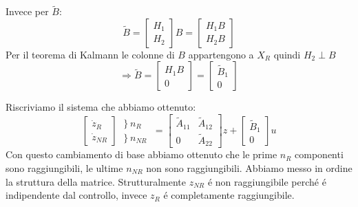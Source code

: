 \documentclass[../main.tex]{subfiles}
\begin{document}
		Invece per $ \tilde B $:
		\[
			\tilde B=
			\begin{bmatrix}
				H_1\\
				H_2
			\end{bmatrix} B =
			\begin{bmatrix}
				H_1 B\\
				H_2 B
			\end{bmatrix}
		\]
		Per il teorema di Kalmann le colonne di $ B $ appartengono a $ X_R $ quindi $ H_2 \perp B $
		\[
			\Rightarrow \tilde B =
			\begin{bmatrix}
				H_1 B\\
				0
			\end{bmatrix} =
			\begin{bmatrix}
					\tilde B_1\\
					0
			\end{bmatrix}
		\]
		
		Riscriviamo il sistema che abbiamo ottenuto:
		\[
			\begin{bmatrix}
				\dot z_R\\
				\dot z_{NR}
			\end{bmatrix}
			\begin{matrix}
				\left. \right\rbrace n_R \phantom{R}\\
				\left. \right\rbrace n_{NR}
			\end{matrix} =
			\begin{bmatrix}
				\tilde A_{11} & \tilde A_{12}\\
				0 & \tilde A_{22}
			\end{bmatrix} z +
			\begin{bmatrix}
				\tilde B_1\\
				0
			\end{bmatrix} u
		\]
		Con questo cambiamento di base abbiamo ottenuto che le prime $ n_R $ componenti sono raggiungibili, le ultime $ n_{NR} $ non sono raggiungibili. Abbiamo messo in ordine la struttura della matrice. Strutturalmente $ z_{NR} $ \'e non raggiungibile perch\'e \'e indipendente dal controllo, invece $ z_R $ \'e completamente raggiungibile.
		
\end{document}
